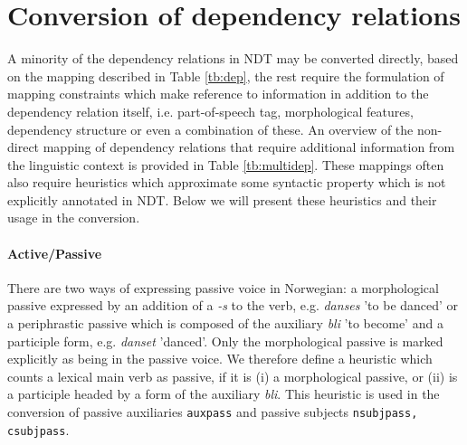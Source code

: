\documentclass[10pt, a4paper]{article}
\begin{document}
\section{Conversion of dependency relations}
A minority of the dependency relations in NDT may be converted
directly, based on the mapping described in Table \ref{tb:dep}, the
rest require the formulation of mapping constraints which make
reference to information in addition to the dependency relation
itself, i.e. part-of-speech tag, morphological features, dependency
structure or even a combination of these. An overview of
the non-direct mapping of dependency relations that require additional
information from the linguistic context is provided in Table \ref{tb:multidep}.
These mappings often also require heuristics which approximate some
syntactic property which is not explicitly annotated in NDT. Below we
will present these heuristics and their usage in the conversion.



\paragraph{Active/Passive}There are two ways of expressing passive voice in Norwegian: a
morphological passive expressed by an addition of a {\it -s} to the
verb, e.g. {\it danses} 'to be danced' or a periphrastic passive which
is composed of the auxiliary {\it bli} 'to become' and a participle
form, e.g. {\it danset} 'danced'. Only the morphological passive is
marked explicitly as being in the passive voice.  We therefore define
a heuristic which counts a lexical main verb as passive, if it is (i)
a morphological passive, or (ii) is a participle headed by a form of
the auxiliary {\it bli}.  This heuristic is used in the conversion of
passive auxiliaries {\tt auxpass} and passive subjects {\tt nsubjpass,
  csubjpass}.
\end{document}
